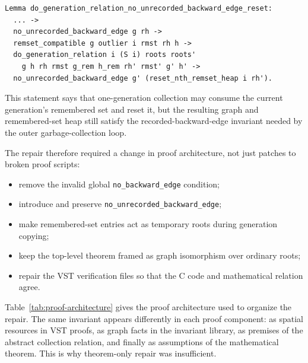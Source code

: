 \documentclass[acmsmall,nonacm]{acmart}
\newcommand{\VST}{VST}
\begin{document}
\begin{lstlisting}
Lemma do_generation_relation_no_unrecorded_backward_edge_reset:
  ... ->
  no_unrecorded_backward_edge g rh ->
  remset_compatible g outlier i rmst rh h ->
  do_generation_relation i (S i) roots roots'
    g h rh rmst g_rem h_rem rh' rmst' g' h' ->
  no_unrecorded_backward_edge g' (reset_nth_remset_heap i rh').
\end{lstlisting}

This statement says that one-generation collection may consume the current
generation's remembered set and reset it, but the resulting graph and
remembered-set heap still satisfy the recorded-backward-edge invariant needed by
the outer garbage-collection loop.

The repair therefore required a change in proof architecture, not just patches
to broken proof scripts:

\begin{itemize}
\item remove the invalid global \texttt{no\_backward\_edge} condition;
\item introduce and preserve \texttt{no\_unrecorded\_backward\_edge};
\item make remembered-set entries act as temporary roots during generation
copying;
\item keep the top-level theorem framed as graph isomorphism over ordinary
roots;
\item repair the \VST{} verification files so that the C code and mathematical
relation agree.
\end{itemize}

Table~\ref{tab:proof-architecture} gives the proof architecture used to organize
the repair.  The same invariant appears differently in each proof component: as
spatial resources in \VST{} proofs, as graph facts in the invariant library, as
premises of the abstract collection relation, and finally as assumptions of the
mathematical theorem.  This is why theorem-only repair was insufficient.
\end{document}
